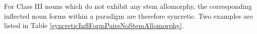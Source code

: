 For Class III nouns which do not exhibit any stem allomorphy, %
the corresponding inflected noun forms within a paradigm are therefore syncretic. %
Two examples are listed in Table \vref{syncreticInflFormPairsNoStemAllomorphy}.
\begin{table}\centering
\caption{Syncretic inflectional form sets for Class III nouns without stem allomorphy}\label{syncreticInflFormPairsNoStemAllomorphy}
\end{table}

